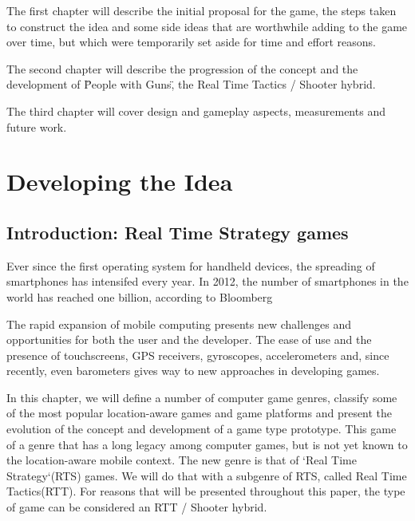 \documentclass{article}
\begin{document}
The first chapter will describe the initial proposal for the game, the steps
taken to construct the idea and some side ideas that are worthwhile adding to
the game over time, but which were temporarily set aside for time and effort
reasons.\newline

The second chapter will describe the progression of the concept and the
development of \"People with Guns\", the Real Time Tactics / Shooter
hybrid.\newline

The third chapter will cover design and gameplay aspects, measurements and
future work.\newline


\section{Developing the Idea}

\subsection{Introduction: Real Time Strategy games}

Ever since the first operating system for handheld devices, the spreading of
smartphones has intensifed every year. In 2012, the number of smartphones in the
world has reached one billion, according to Bloomberg\cite{bloomberg} \newline

The rapid expansion of mobile computing presents new challenges and
opportunities for both the user and the developer. The ease of use and the
presence of touchscreens, GPS receivers, gyroscopes, accelerometers and, since
recently, even barometers gives way to new approaches in developing
games.\newline

In this chapter, we will define a number of computer game genres, classify some
of the most popular location-aware games and game platforms and present the
evolution of the concept and development of a game type prototype. This game of
a genre that has a long legacy among computer games, but is not yet known to the
location-aware mobile context. The new genre is that of `Real Time
Strategy`(RTS)\cite{rts} games. We will do that with a subgenre
of RTS, called Real Time Tactics(RTT)\cite{rttvsrts}. For reasons that will be
presented throughout this paper, the type of game can be considered an
RTT / Shooter hybrid. \newline
\end{document}
